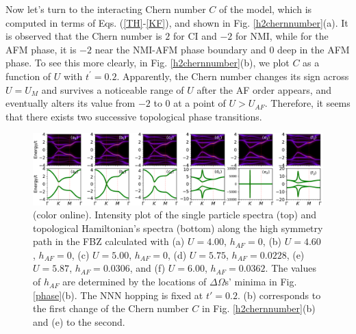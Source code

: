 \documentclass[12pt]{iopart}
\begin{document}
\par Now let's turn to the interacting Chern number $C$ of the model, which is computed in terms of Eqs. (\ref{TH}-\ref{KF}), and shown in Fig. \ref{h2chernnumber}(a). It is observed that the Chern number is $2$ for CI and $-2$ for NMI, while for the AFM phase, it is $-2$ near the NMI-AFM phase boundary and $0$ deep in the AFM phase. To see this more clearly, in Fig. \ref{h2chernnumber}(b), we plot $C$ as a function of $U$ with $t^\prime=0.2$. Apparently, the Chern number changes its sign across $U=U_M$ and survives a noticeable range of $U$ after the AF order appears, and eventually alters its value from $-2$ to $0$ at a point of $U>U_{AF}$. Therefore, it seems that there exists two successive topological phase transitions.

\begin{figure}
\centering
\includegraphics[scale=0.45]{h2spectra}
\caption{(color online). Intensity plot of the single particle spectra (top) and topological Hamiltonian's spectra (bottom) along the high symmetry path in the FBZ calculated with (a) $U=4.00$, $h_{AF}=0$, (b) $U=4.60$, $h_{AF}=0$, (c) $U=5.00$, $h_{AF}=0$, (d) $U=5.75$, $h_{AF}=0.0228$, (e) $U=5.87$, $h_{AF}=0.0306$, and (f) $U=6.00$, $h_{AF}=0.0362$. The values of $h_{AF}$ are determined by the locations of $\Delta\Omega$s' minima in Fig. \ref{phase}(b). The NNN hopping is fixed at $t'=0.2$. (b) corresponds to the first change of the Chern number $C$ in Fig. \ref{h2chernnumber}(b) and (e) to the second.}\label{h2spectra}
\end{figure}
\end{document}
